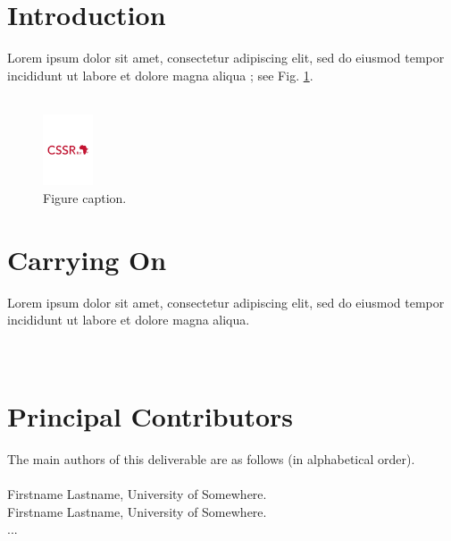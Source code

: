 \documentclass{CSSRforAfrica}
\newcommand{\blank}{~\\}
\begin{document}
\section{Introduction}
Lorem ipsum dolor sit amet, consectetur adipiscing elit, sed do eiusmod tempor incididunt ut labore et dolore magna aliqua \cite{Bartnecketal2020}; see Fig. \ref{fig:xyz}.
 \\~\\
\begin{figure}[thb]
\begin{center}
\includegraphics[height=21mm,angle=0]{CSSRforAfrica_logo_red.pdf} %
\end{center}
\caption{Figure caption.}                                                        %
\label{fig:xyz}                                                                        %
\end{figure}
 

\section{Carrying On}
Lorem ipsum dolor sit amet, consectetur adipiscing elit, sed do eiusmod tempor incididunt ut labore et dolore magna aliqua.
 \\~\\
\

\newpage




\pagebreak
\section*{Principal Contributors}
\label{contributors}
The main authors of this deliverable are as follows (in alphabetical order).
\blank
~
\blank
Firstname Lastname, University of Somewhere.\\    %
Firstname Lastname, University of Somewhere.\\    %
...                                                                            %
 
\end{document}
